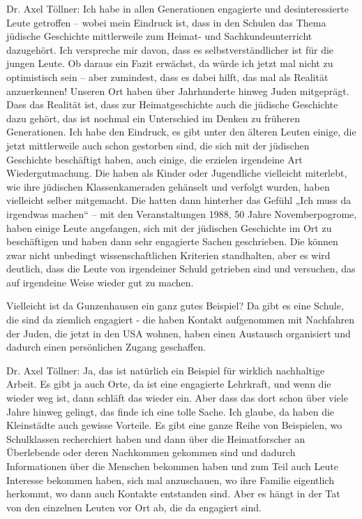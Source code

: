  
Dr. Axel Töllner: Ich habe in allen Generationen engagierte und desinteressierte Leute getroffen – wobei mein Eindruck ist, dass in den Schulen das Thema jüdische Geschichte mittlerweile zum Heimat- und Sachkundeunterricht dazugehört. Ich verspreche mir davon, dass es selbstverständlicher ist für die jungen Leute. Ob daraus ein Fazit erwächst, da würde ich jetzt mal nicht zu optimistisch sein – aber zumindest, dass es dabei hilft, das mal als Realität anzuerkennen! Unseren Ort haben über Jahrhunderte hinweg Juden mitgeprägt. Dass das Realität ist, dass zur Heimatgeschichte auch die jüdische Geschichte dazu gehört, das ist nochmal ein Unterschied im Denken zu früheren Generationen. Ich habe den Eindruck, es gibt unter den älteren Leuten einige, die jetzt mittlerweile auch schon gestorben sind, die sich mit der jüdischen Geschichte beschäftigt haben, auch einige, die erzielen irgendeine Art Wiedergutmachung. Die haben als Kinder oder Jugendliche vielleicht miterlebt, wie ihre jüdischen Klassenkameraden gehänselt und verfolgt wurden, haben vielleicht selber mitgemacht. Die hatten dann hinterher das Gefühl „Ich muss da irgendwas machen“ – mit den Veranstaltungen 1988, 50 Jahre Novemberpogrome, haben einige Leute angefangen, sich mit der jüdischen Geschichte im Ort zu beschäftigen und haben dann sehr engagierte Sachen geschrieben. Die können zwar nicht unbedingt wissenschaftlichen Kriterien standhalten, aber es wird deutlich, dass die Leute von irgendeiner Schuld getrieben sind und versuchen, das auf irgendeine Weise wieder gut zu machen. 

 
Vielleicht ist da Gunzenhausen ein ganz gutes Beispiel? Da gibt es eine Schule, die sind da ziemlich engagiert - die haben Kontakt aufgenommen mit Nachfahren der Juden, die jetzt in den USA wohnen, haben einen Austausch organisiert und dadurch einen persönlichen Zugang geschaffen. 

 
Dr. Axel Töllner: Ja, das ist natürlich ein Beispiel für wirklich nachhaltige Arbeit. Es gibt ja auch Orte, da ist eine engagierte Lehrkraft, und wenn die wieder weg ist, dann schläft das wieder ein. Aber dass das dort schon über viele Jahre hinweg gelingt, das finde ich eine tolle Sache. Ich glaube, da haben die Kleinstädte auch gewisse Vorteile.  
Es gibt eine ganze Reihe von Beispielen, wo Schulklassen recherchiert haben und dann über die Heimatforscher an Überlebende oder deren Nachkommen gekommen sind und dadurch Informationen über die Menschen bekommen haben und zum Teil auch Leute Interesse bekommen haben, sich mal anzuschauen, wo ihre Familie eigentlich herkommt, wo dann auch Kontakte entstanden sind. Aber es hängt in der Tat von den einzelnen Leuten vor Ort ab, die da engagiert sind. 

